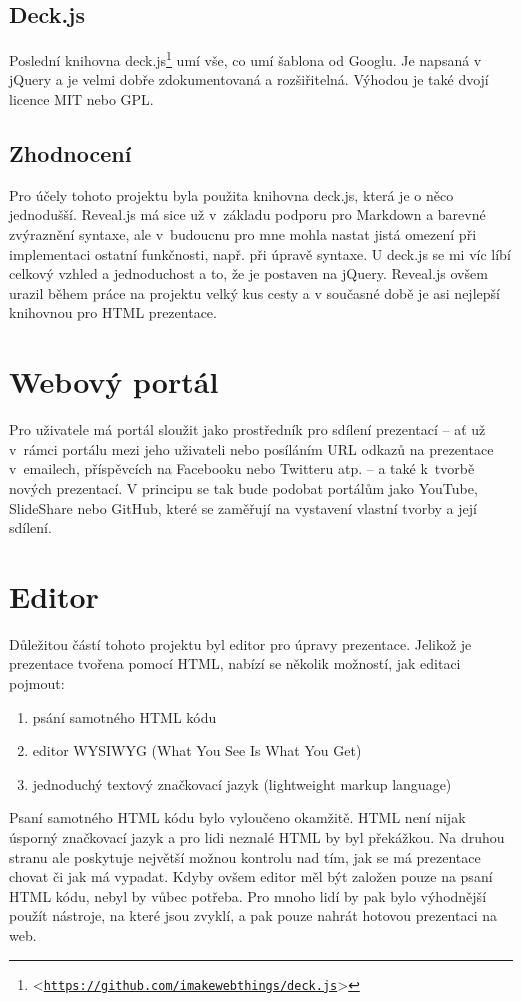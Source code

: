 \documentclass[11pt,twoside,a4paper]{book}
\let\oldUrl\url									%
\renewcommand\url[1]{<\texttt{\oldUrl{#1}}>}
\begin{document}
\subsection{Deck.js}
Poslední knihovna deck.js\footnote{\url{https://github.com/imakewebthings/deck.js}} umí vše, co umí šablona od Googlu. Je napsaná v jQuery a je velmi dobře zdokumentovaná a rozšiřitelná. Výhodou je také dvojí licence MIT nebo GPL.

\subsection{Zhodnocení}
Pro účely tohoto projektu byla použita knihovna deck.js, která je o něco jednodušší. Reveal.js má sice už v~základu podporu pro Markdown a barevné zvýraznění syntaxe, ale v~budoucnu pro mne mohla nastat jistá omezení při implementaci ostatní funkčnosti, např. při úpravě syntaxe. U deck.js se mi víc líbí celkový vzhled a jednoduchost a to, že je postaven na jQuery. Reveal.js ovšem urazil během práce na projektu velký kus cesty a v současné době je asi nejlepší knihovnou pro HTML prezentace.


\section{Webový portál}
Pro uživatele má portál sloužit jako prostředník pro sdílení prezentací – ať už v~rámci portálu mezi jeho uživateli nebo
posíláním URL odkazů na prezentace v~emailech, příspěvcích na Facebooku nebo Twitteru atp. – a také k~tvorbě nových
prezentací. V principu se tak bude podobat portálům jako YouTube, SlideShare nebo GitHub, které se zaměřují na vystavení vlastní tvorby a její sdílení.

\section{Editor}
Důležitou částí tohoto projektu byl editor pro úpravy prezentace. Jelikož je prezentace tvořena pomocí HTML, nabízí se
několik možností, jak editaci pojmout:

\begin{enumerate}
	\item psání samotného HTML kódu
	\item editor WYSIWYG (What You See Is What You Get)
	\item jednoduchý textový značkovací jazyk (lightweight markup language)
\end{enumerate}

Psaní samotného HTML kódu bylo vyloučeno okamžitě. HTML není nijak úsporný značkovací jazyk a pro lidi neznalé HTML by
byl překážkou. Na druhou stranu ale poskytuje největší možnou kontrolu nad tím, jak se má prezentace chovat či jak má
vypadat. Kdyby ovšem editor měl být založen pouze na psaní HTML kódu, nebyl by vůbec potřeba. Pro mnoho lidí by pak bylo
výhodnější použít nástroje, na které jsou zvyklí, a pak pouze nahrát hotovou prezentaci na web.
\end{document}

